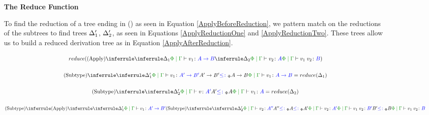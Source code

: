 \documentclass{Report}
\begin{document}
\begin{figure}[H]
    \begin{framed}
        \begin{center}
            \textbf{The Reduce Function}   \par
        \end{center}

    \case{\vapply}
    To find the reduction of a tree ending in (\textit{\vapply}) as seen in Equation \ref{ApplyBeforeReduction}, we pattern match on the reductions of the subtrees to find trees $\Delta_1'$, $\Delta_2'$, as seen in Equations \ref{ApplyReductionOne} and \ref{ApplyReductionTwo}. These trees allow us to build a reduced derivation tree as in Equation \ref{ApplyAfterReduction}.

    \begin{equation}\label{ApplyBeforeReduction}
        \scalebox{.8}{$
        \reduce(\ntreeruleII{\vapply}{
            \treeruleI{\D_1}{
                \gpetyperelation{v_1}{\ab}
            }
        }{
            \treeruleI{\D_2}{
                \gpetyperelation{v_2}{A}
            }
        }{
            \gpetyperelation{\apply{v_1}{v_2}}{B}
        })
        $}
    \end{equation}

    \begin{equation}\label{ApplyReductionOne}
        \scalebox{.8}{$
            \ntreeruleII{\vsubtype}{
                \treeruleI{\D'_1}{\gpetyperelation{v_1}{\fntype{A'}{B'}}}
            }{
                \fntype{A'}{B'}\subtypep\fntype{A}{B}
            }{
                \gpetyperelation{v_1}{\ab}
            }  = \reduce(\D_1)
            $}
    \end{equation}

    \begin{equation}\label{ApplyReductionTwo}
        \scalebox{.8}{$
        \ntreeruleII{\vsubtype}{
            \treeruleI{\D'_2}{\gpetyperelation{v}{A'}}
        }{
            A'\subtypep A
        }{
            \gpetyperelation{v_1}{A}
        } = \reduce(\D_2)
        $}
    \end{equation}


    \begin{equation}\label{ApplyAfterReduction}
        \scalebox{.8}{$
        \ntreeruleII{\vsubtype}{
            \ntreeruleII{\vapply}{
                \treeruleI{
                    \D'_1
                }{
                    \gpetyperelation{v_1}{\fntype{A'}{B'}}
                }
            }{
                \ntreeruleII{\vsubtype}{
                    \treeruleI{\D'_2}{\gpetyperelation{v_2}{A''}}
                }{
                    A'' \subtypep A \subtypep A'
                } {
                    \gpetyperelation{v_2}{A'}
                }
            }{
                \gpetyperelation{\apply{v_1}{v_2}}{B'}
            }
        }{
            B' \subtypep B
        }{
            \gpetyperelation{\apply{v_1}{v_2}}{B}
        }
        $}
    \end{equation}



\end{framed}
\end{figure}
\end{document}
